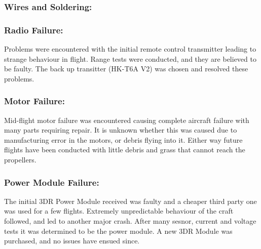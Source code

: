 \subsubsection*{Wires and Soldering:}  

\subsubsection*{Radio Failure:} Problems were encountered with the initial remote control  transmitter leading to strange behaviour in flight. Range tests were conducted, and they are believed to be faulty. The back up transitter (HK-T6A V2) was chosen and resolved these problems.

\subsubsection*{Motor Failure:} Mid-flight motor failure was encountered causing complete aircraft failure with many parts requiring repair. It is unknown whether this was caused due to manufacturing error in the motors, or debris flying into it. Either way future flights have been conducted with little debris and grass that cannot reach the propellers. 

\subsubsection*{Power Module Failure:}  The initial 3DR Power Module received was faulty and a cheaper third party one was used for a few flights. Extremely unpredictable behaviour of the craft followed, and led to another major crash. After many sesnor, current and voltage tests it was determined to be the power module. A new 3DR Module was purchased, and no issues have ensued since.  

